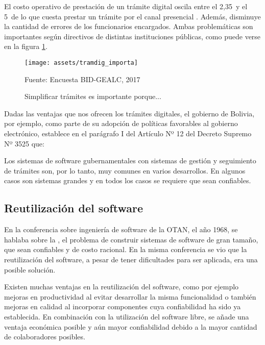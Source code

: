 El costo operativo de prestación de un trámite digital oscila entre el 2,35\percentsign~y el 5\percentsign~de lo que cuesta prestar un trámite por el canal presencial \cite[11]{parejaGestionIdentidadSu}.
Además, disminuye la cantidad de errores de los funcionarios encargados.
Ambas problemáticas son importantes según directivos de distintas instituciones públicas, como puede verse en la figura \ref{fig:tramdig_importa}.

\begin{figure}[!hbpt]
	\centering
	\texttt{[image: assets/tramdig\_importa]}
	\caption{Simplificar trámites es importante porque...}{Fuente: Encuesta BID-GEALC, 2017}
	\label{fig:tramdig_importa}
\end{figure}

Dadas las ventajas que nos ofrecen los trámites digitales, el gobierno de Bolivia, por ejemplo, como parte de su adopción de políticas favorables al gobierno electrónico, 
establece en el parágrafo I del Artículo Nº 12 del Decreto Supremo Nº 3525\cite{DECRETOSUPREMO35252018} que: 

Los sistemas de software gubernamentales con sistemas de gestión y seguimiento de trámites son, por lo tanto, muy comunes en varios desarrollos. 
En algunos casos son sistemas grandes y en todos los casos se requiere que sean confiables.

\subsection{Reutilización del software}

En la conferencia sobre ingeniería de software de la OTAN, el año 1968, se hablaba sobre la , 
el problema de construir sistemas de software de gran tamaño, que sean confiables y de costo racional.
En la misma conferencia se vio que la reutilización del software, a pesar de tener dificultades para ser aplicada, era una posible solución\cite{kruegerSoftwareReuse1992}.

Existen muchas ventajas en la reutilización del software, 
como por ejemplo mejoras en productividad al evitar desarrollar la misma funcionalidad o también 
mejoras en calidad al incorporar componentes cuya confiabilidad ha sido ya establecida\cite{selbyEnablingReusebasedSoftware2005}. 
En combinación con la utilización del software libre, se añade una ventaja económica posible y aún mayor confiabilidad debido a la mayor cantidad de colaboradores posibles.


